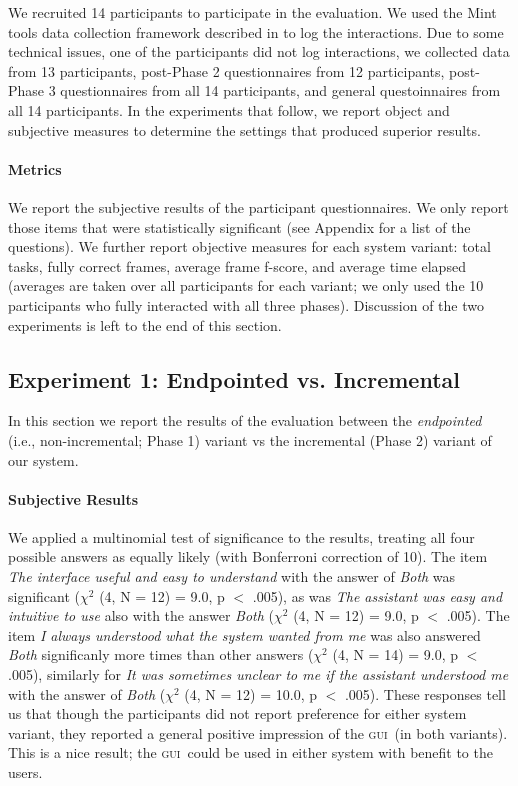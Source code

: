 \documentclass[11pt]{article}
\newcommand{\ui}[0]{\textsc{gui}}
\begin{document}
We recruited 14 participants to participate in the evaluation. We used the Mint tools data collection framework described in  to log the interactions. Due to some technical issues, one of the participants did not log interactions, we collected data from 13 participants, post-Phase 2 questionnaires from 12 participants,  post-Phase 3 questionnaires from all 14 participants, and general questoinnaires from all 14 participants. In the experiments that follow, we report object and subjective measures to determine the settings that produced superior results.

\paragraph{Metrics} We report the subjective results of the participant questionnaires. We only report those items that were statistically significant (see Appendix for a list of the questions). We further report objective measures for each system variant: total tasks, fully correct frames, average frame f-score, and average time elapsed (averages are taken over all participants for each variant; we only used the 10 participants who fully interacted with all three phases). Discussion of the two experiments is left to the end of this section.

\subsection{Experiment 1: Endpointed vs. Incremental}
\label{section:exp1}

In this section we report the results of the evaluation between the \emph{endpointed} (i.e., non-incremental; Phase 1) variant vs the incremental (Phase 2) variant of our system.

\paragraph{Subjective Results} We applied a multinomial test of significance to the results, treating all four possible answers as equally likely (with Bonferroni correction of 10). The item \emph{The interface useful and easy to understand} with the answer of \emph{Both} was significant ($ \chi^2 $ (4, N = 12) = 9.0, p $<$ .005), as was \emph{The assistant was easy and intuitive to use} also with the answer \emph{Both} ($ \chi^2 $ (4, N = 12) = 9.0, p $<$ .005). The item \emph{I always understood what the system wanted from me} was also answered \emph{Both} significanly more times than other answers ($ \chi^2 $ (4, N = 14) = 9.0, p $<$ .005), similarly for \emph{It was sometimes unclear to me if the assistant understood me} with the answer of \emph{Both} ($ \chi^2 $ (4, N = 12) = 10.0, p $<$ .005).  These responses tell us that though the participants did not report preference for either system variant, they reported a general positive impression of the \ui\ (in both variants). This is a nice result; the \ui\ could be used in either system with benefit to the users.
\end{document}
